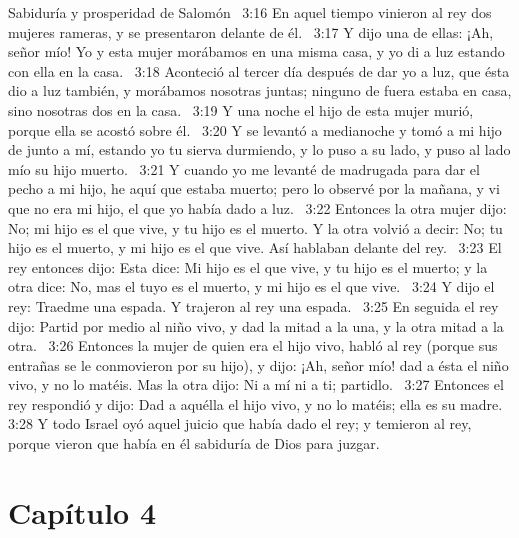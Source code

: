 Sabiduría y prosperidad de Salomón  
3:16 En aquel tiempo vinieron al rey dos mujeres rameras, y se presentaron delante de él.  
3:17 Y dijo una de ellas: ¡Ah, señor mío! Yo y esta mujer morábamos en una misma casa, y yo di a luz estando con ella en la casa.  
3:18 Aconteció al tercer día después de dar yo a luz, que ésta dio a luz también, y morábamos nosotras juntas; ninguno de fuera estaba en casa, sino nosotras dos en la casa.  
3:19 Y una noche el hijo de esta mujer murió, porque ella se acostó sobre él.  
3:20 Y se levantó a medianoche y tomó a mi hijo de junto a mí, estando yo tu sierva durmiendo, y lo puso a su lado, y puso al lado mío su hijo muerto.  
3:21 Y cuando yo me levanté de madrugada para dar el pecho a mi hijo, he aquí que estaba muerto; pero lo observé por la mañana, y vi que no era mi hijo, el que yo había dado a luz.  
3:22 Entonces la otra mujer dijo: No; mi hijo es el que vive, y tu hijo es el muerto. Y la otra volvió a decir: No; tu hijo es el muerto, y mi hijo es el que vive. Así hablaban delante del rey.  
3:23 El rey entonces dijo: Esta dice: Mi hijo es el que vive, y tu hijo es el muerto; y la otra dice: No, mas el tuyo es el muerto, y mi hijo es el que vive.  
3:24 Y dijo el rey: Traedme una espada. Y trajeron al rey una espada.  
3:25 En seguida el rey dijo: Partid por medio al niño vivo, y dad la mitad a la una, y la otra mitad a la otra.  
3:26 Entonces la mujer de quien era el hijo vivo, habló al rey (porque sus entrañas se le conmovieron por su hijo), y dijo: ¡Ah, señor mío! dad a ésta el niño vivo, y no lo matéis. Mas la otra dijo: Ni a mí ni a ti; partidlo.  
3:27 Entonces el rey respondió y dijo: Dad a aquélla el hijo vivo, y no lo matéis; ella es su madre.  
3:28 Y todo Israel oyó aquel juicio que había dado el rey; y temieron al rey, porque vieron que había en él sabiduría de Dios para juzgar.  
\section*{Capítulo 4 }

